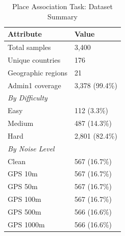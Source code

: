 
\begin{table}[htbp]
\centering
\caption{Place Association Task: Dataset Summary}
\label{tab:place_association_summary}
\begin{tabular}{ll}
\toprule
\textbf{Attribute} & \textbf{Value} \\
\midrule
Total samples & 3,400 \\
Unique countries & 176 \\
Geographic regions & 21 \\
Admin1 coverage & 3,378 (99.4\%) \\
\midrule
\multicolumn{2}{l}{\textit{By Difficulty}} \\
\quad Easy & 112 (3.3\%) \\
\quad Medium & 487 (14.3\%) \\
\quad Hard & 2,801 (82.4\%) \\
\midrule
\multicolumn{2}{l}{\textit{By Noise Level}} \\
\quad Clean & 567 (16.7\%) \\
\quad GPS 10m & 567 (16.7\%) \\
\quad GPS 50m & 567 (16.7\%) \\
\quad GPS 100m & 567 (16.7\%) \\
\quad GPS 500m & 566 (16.6\%) \\
\quad GPS 1000m & 566 (16.6\%) \\
\bottomrule
\end{tabular}
\end{table}


